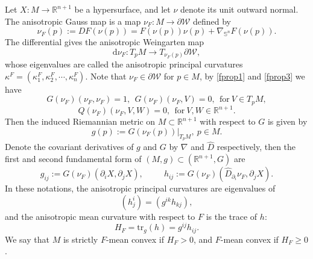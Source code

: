 \documentclass[11pt,reqno]{amsart}
\theoremstyle{definition}
\theoremstyle{remark}
\numberwithin{equation}{section}
\begin{document}
	Let $X:M\to\mathbb{R}^{n+1}$ be a hypersurface, and let $\nu$ denote its unit outward normal. The anisotropic Gauss map  is a map $\nu_F:M \to \partial\mathcal{W}$ defined by
	\begin{equation*}
    \nu_F(p):=DF(\nu(p))=F(\nu(p))\nu(p)+\nabla_{\mathbb{S}^n}F(\nu(p)).
	\end{equation*}
	The differential gives the anisotropic Weingarten map 
    \begin{equation*}
		\mathrm{d}\nu_F : T_{p}M \to T_{\nu_F(p)}\partial\mathcal{W},
	\end{equation*}
whose eigenvalues are called the  anisotropic principal curvatures $\kappa^{F}=\left( \kappa_1^F,\kappa_2^F,\cdots,\kappa_n^F \right)$.	
	Note that $\nu_F \in \partial\mathcal{W}$ for $p\in M$, by \eqref{fprop1} and \eqref{fprop3} we have
	\begin{equation*}
		G(\nu_F)(\nu_F,\nu_F)=1,\ \ G(\nu_F)(\nu_F,V)=0,\ \ \text{for}\ V\in T_{p}M,
	\end{equation*}
	\begin{equation}
		Q(\nu_F)(\nu_F,V,W)=0,\ \ \text{for}\ V,W\in\mathbb{R}^{n+1}.
		\label{equ-q}
	\end{equation}
	Then the induced Riemannian metric on $M\subset\mathbb{R}^{n+1}$ with respect to $G$ is given by
	\begin{equation*}
		g(p):= G\left(\nu_F(p)\right)|_{T_p M},\ p\in M.
	\end{equation*}
	Denote the covariant derivatives of $g$ and $G$ by $\nabla$ and $\hat{D}$ respectively, then the first and second fundamental form of $(M,g)\subset (\mathbb{R}^{n+1},G)$ are
	\begin{equation*}
		g_{ij}:= G(\nu_{F})(\partial_i X,\partial_j X),\ \ \qquad h_{ij}:= G(\nu_F)(\hat{D}_{\partial_i}\nu_F,\partial_j X).
	\end{equation*}
	In these notations,  the anisotropic principal curvatures are eigenvalues of 
    \begin{equation*}
      \left(h^i_j\right)=\left(g^{ik}h_{kj}\right),
    \end{equation*}
and the anisotropic mean curvature with respect to $F$ is the trace of $h$: 
	\begin{equation*}
		H_F = \mathrm{tr}_{g}(h) = g^{ij}h_{ij}.
	\end{equation*}
	We say that $M$ is strictly $F$-mean convex if $H_F>0$, and $F$-mean convex if $H_F\geq 0$.
	
\end{document}
